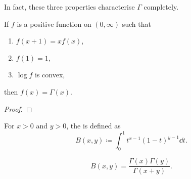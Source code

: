In fact, these three properties characterise $\Gamma$ completely.

\begin{lemma} \label{lemma:gamma-char}
If $f$ is a positive function on $(0,\infty)$ such that
\begin{enumerate}[label=(\arabic*)]
\item $f(x+1)=xf(x)$,
\item $f(1)=1$,
\item $\log f$ is convex,
\end{enumerate}
then $f(x)=\Gamma(x)$.
\end{lemma}

\begin{proof}

\end{proof}

\begin{definition}
For $x>0$ and $y>0$, the  is defined as
\[B(x,y)\coloneqq\int_0^1 t^{x-1}(1-t)^{y-1}\dd{t}.\]
\end{definition}

\begin{lemma}
\[B(x,y)=\frac{\Gamma(x)\Gamma(y)}{\Gamma(x+y)}.\]
\end{lemma}

